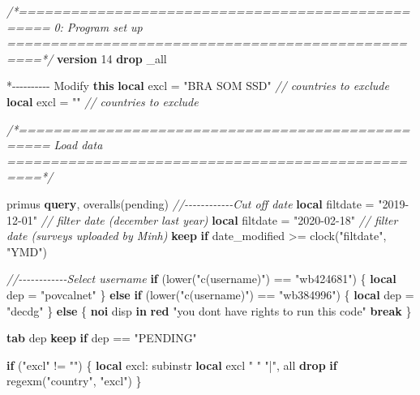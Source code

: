 \documentclass[
]{book}
\newenvironment{Shaded}{\begin{snugshade}}{\end{snugshade}}
\newcommand{\CommentTok}[1]{\textcolor[rgb]{0.56,0.35,0.01}{\textit{#1}}}
\newcommand{\DataTypeTok}[1]{\textcolor[rgb]{0.13,0.29,0.53}{#1}}
\newcommand{\FunctionTok}[1]{\textcolor[rgb]{0.00,0.00,0.00}{#1}}
\newcommand{\KeywordTok}[1]{\textcolor[rgb]{0.13,0.29,0.53}{\textbf{#1}}}
\newcommand{\NormalTok}[1]{#1}
\newcommand{\OtherTok}[1]{\textcolor[rgb]{0.56,0.35,0.01}{#1}}
\newcommand{\StringTok}[1]{\textcolor[rgb]{0.31,0.60,0.02}{#1}}
\begin{document}
\begin{Shaded}
\begin{Highlighting}[]
\CommentTok{/*==================================================}
\CommentTok{0: Program set up}
\CommentTok{==================================================*/}
\KeywordTok{version}\NormalTok{ 14}
\KeywordTok{drop} \DataTypeTok{\_all}

\NormalTok{*{-}{-}{-}{-}{-}{-}{-}{-}{-}{-} Modify }\KeywordTok{this}
\KeywordTok{local}\NormalTok{ excl = }\StringTok{"BRA SOM SSD"} \CommentTok{// countries to exclude }
\KeywordTok{local}\NormalTok{ excl = }\StringTok{""} \CommentTok{// countries to exclude }

\CommentTok{/*==================================================}
\CommentTok{Load data}
\CommentTok{==================================================*/}

\NormalTok{primus }\KeywordTok{query}\NormalTok{, overalls(pending)}
\CommentTok{//{-}{-}{-}{-}{-}{-}{-}{-}{-}{-}{-}{-}Cut off date}
\KeywordTok{local}\NormalTok{ filtdate = }\StringTok{"2019{-}12{-}01"} \CommentTok{// filter date (december last year)}
\KeywordTok{local}\NormalTok{ filtdate = }\StringTok{"2020{-}02{-}18"} \CommentTok{// filter date (surveys uploaded by Minh)}
\KeywordTok{keep} \KeywordTok{if}\NormalTok{  date\_modified \textgreater{}= clock(}\StringTok{"\textasciigrave{}filtdate\textquotesingle{}"}\NormalTok{, }\StringTok{"YMD"}\NormalTok{)}

\CommentTok{//{-}{-}{-}{-}{-}{-}{-}{-}{-}{-}{-}{-}Select username}
\KeywordTok{if}\NormalTok{ (}\FunctionTok{lower}\NormalTok{(}\StringTok{"\textasciigrave{}c(username)\textquotesingle{}"}\NormalTok{) == }\StringTok{"wb424681"}\NormalTok{) \{}
  \KeywordTok{local}\NormalTok{ dep = }\StringTok{"povcalnet"}
\NormalTok{\}}
\KeywordTok{else} \KeywordTok{if}\NormalTok{ (}\FunctionTok{lower}\NormalTok{(}\StringTok{"\textasciigrave{}c(username)\textquotesingle{}"}\NormalTok{) == }\StringTok{"wb384996"}\NormalTok{) \{}
  \KeywordTok{local}\NormalTok{ dep = }\StringTok{"decdg"}
\NormalTok{\}}
\KeywordTok{else}\NormalTok{ \{}
  \KeywordTok{noi}\NormalTok{ disp }\KeywordTok{in} \KeywordTok{red} \StringTok{"you don\textquotesingle{}t have rights to run this code"}
  \KeywordTok{break}
\NormalTok{\}}

\KeywordTok{tab} \OtherTok{\textasciigrave{}dep\textquotesingle{}}
\KeywordTok{keep} \KeywordTok{if} \OtherTok{\textasciigrave{}dep\textquotesingle{}}\NormalTok{ == }\StringTok{"PENDING"}

\KeywordTok{if}\NormalTok{ (}\StringTok{"\textasciigrave{}excl\textquotesingle{}"}\NormalTok{ != }\StringTok{""}\NormalTok{) \{}
  \KeywordTok{local}\NormalTok{ excl: }\FunctionTok{subinstr} \KeywordTok{local}\NormalTok{ excl }\StringTok{" "} \StringTok{"|"}\NormalTok{, }\OtherTok{all}
  \KeywordTok{drop} \KeywordTok{if} \FunctionTok{regexm}\NormalTok{(}\StringTok{"\textasciigrave{}country\textquotesingle{}"}\NormalTok{, }\StringTok{"\textasciigrave{}excl\textquotesingle{}"}\NormalTok{) }
\NormalTok{\}}


\end{Highlighting}
\end{Shaded}
\end{document}
